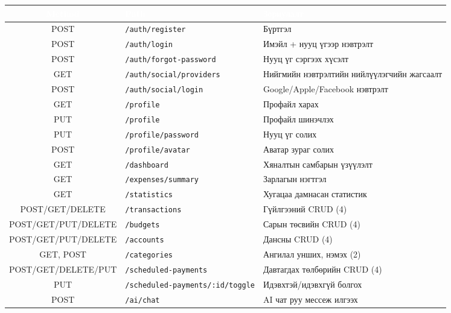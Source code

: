 \begin{table}[ht]
\centering
\footnotesize
\renewcommand{\arraystretch}{1.2}
\begin{tabular}{|c|p{4.2cm}|p{6cm}|}
\hline
\rowcolor{darknavy}
\textcolor{white}{\textbf{Method}} & \textcolor{white}{\textbf{Path}} & \textcolor{white}{\textbf{Зориулалт}} \\ \hline
POST   & \texttt{/auth/register}            & Бүртгэл \\ \hline
POST   & \texttt{/auth/login}               & Имэйл + нууц үгээр нэвтрэлт \\ \hline
POST   & \texttt{/auth/forgot-password}     & Нууц үг сэргээх хүсэлт \\ \hline
GET    & \texttt{/auth/social/providers}    & Нийгмийн нэвтрэлтийн нийлүүлэгчийн жагсаалт \\ \hline
POST   & \texttt{/auth/social/login}        & Google/Apple/Facebook нэвтрэлт \\ \hline
GET    & \texttt{/profile}                  & Профайл харах \\ \hline
PUT    & \texttt{/profile}                  & Профайл шинэчлэх \\ \hline
PUT    & \texttt{/profile/password}         & Нууц үг солих \\ \hline
POST   & \texttt{/profile/avatar}           & Аватар зураг солих \\ \hline
GET    & \texttt{/dashboard}                & Хяналтын самбарын үзүүлэлт \\ \hline
GET    & \texttt{/expenses/summary}         & Зарлагын нэгтгэл \\ \hline
GET    & \texttt{/statistics}               & Хугацаа дамнасан статистик \\ \hline
POST/GET/DELETE & \texttt{/transactions}    & Гүйлгээний CRUD (4) \\ \hline
POST/GET/PUT/DELETE & \texttt{/budgets}     & Сарын төсвийн CRUD (4) \\ \hline
POST/GET/PUT/DELETE & \texttt{/accounts}    & Дансны CRUD (4) \\ \hline
GET, POST & \texttt{/categories}            & Ангилал унших, нэмэх (2) \\ \hline
POST/GET/DELETE/PUT & \texttt{/scheduled-payments} & Давтагдах төлбөрийн CRUD (4) \\ \hline
PUT    & \texttt{/scheduled-payments/:id/toggle} & Идэвхтэй/идэвхгүй болгох \\ \hline
POST   & \texttt{/ai/chat}                  & AI чат руу мессеж илгээх \\ \hline

\end{tabular}
\end{table}
